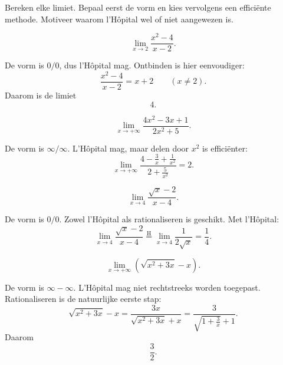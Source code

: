 \documentclass{ximera}
\begin{document}
\begin{oefening}{\oefU\ESS}

Bereken elke limiet. Bepaal eerst de vorm en kies vervolgens een
efficiënte methode. Motiveer waarom l'Hôpital wel of niet aangewezen is.

\begin{question}
\[\lim_{x\to2}\frac{x^2-4}{x-2}.\]

\begin{oplossing}
De vorm is \(0/0\), dus l'Hôpital mag. Ontbinden is hier eenvoudiger:
\[\frac{x^2-4}{x-2}=x+2\qquad(x\neq2).\]
Daarom is de limiet
\[\boxed{4}.\]
\end{oplossing}
\end{question}

\begin{question}
\[\lim_{x\to+\infty}\frac{4x^2-3x+1}{2x^2+5}.\]

\begin{oplossing}
De vorm is \(\infty/\infty\). L'Hôpital mag, maar delen door \(x^2\)
is efficiënter:
\[\lim_{x\to+\infty}\frac{4-\frac3x+\frac1{x^2}}{2+\frac5{x^2}}=2.\]
\end{oplossing}
\end{question}

\begin{question}
\[\lim_{x\to4}\frac{\sqrt{x}-2}{x-4}.\]

\begin{oplossing}
De vorm is \(0/0\). Zowel l'Hôpital als rationaliseren is geschikt.
Met l'Hôpital:
\[\lim_{x\to4}\frac{\sqrt{x}-2}{x-4}\overset{\mathrm H}{=}\lim_{x\to4}\frac1{2\sqrt{x}}=\frac14.\]
\end{oplossing}
\end{question}

\begin{question}
\[\lim_{x\to+\infty}\left(\sqrt{x^2+3x}-x\right).\]

\begin{oplossing}
De vorm is \(\infty-\infty\). L'Hôpital mag niet rechtstreeks worden
toegepast. Rationaliseren is de natuurlijke eerste stap:
\[
\sqrt{x^2+3x}-x
=\frac{3x}{\sqrt{x^2+3x}+x}
=\frac3{\sqrt{1+\frac3x}+1}.
\]
Daarom
\[\boxed{\frac32}.\]
\end{oplossing}
\end{question}
\end{oefening}
\end{document}
